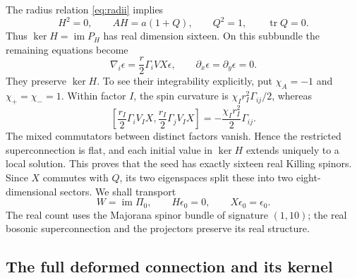 The radius relation \eqref{eq:radii} implies
\begin{equation}\label{susy:seed-projector}
 H^2=0,\qquad AH=a(1+Q),\qquad Q^2=1,\qquad
 \operatorname{tr}Q=0.
\end{equation}
Thus $\ker H=\operatorname{im}P_H$ has real dimension sixteen. On this subbundle the remaining equations become
\begin{equation}\label{susy:seed-reduced}
 \nabla_i\epsilon=\frac r2\Gamma_iVX\epsilon,
 \qquad \partial_x\epsilon=\partial_y\epsilon=0.
\end{equation}
They preserve $\ker H$. To see their integrability explicitly, put
$\chi_A=-1$ and $\chi_+=\chi_-=1$. Within factor $I$, the spin curvature is
$\chi_Ir_I^2\Gamma_{ij}/2$, whereas
\begin{equation}\label{susy:seed-flatness}
 \left[\frac{r_I}{2}\Gamma_iV_IX,
       \frac{r_I}{2}\Gamma_jV_IX\right]
 =-\frac{\chi_Ir_I^2}{2}\Gamma_{ij}.
\end{equation}
The mixed commutators between distinct factors vanish. Hence the restricted superconnection is flat, and each initial value in $\ker H$ extends uniquely to a local solution. This proves that the seed has exactly sixteen real Killing spinors. Since $X$ commutes with $Q$, its two eigenspaces split these into two eight-dimensional sectors. We shall transport
\begin{equation}\label{susy:seed-sector}
 W=\operatorname{im}\Pi_0,\qquad H\epsilon_0=0,\qquad X\epsilon_0=\epsilon_0.
\end{equation}
The real count uses the Majorana spinor bundle of signature $(1,10)$; the real bosonic superconnection and the projectors preserve its real structure.

\subsection{The full deformed connection and its kernel}

